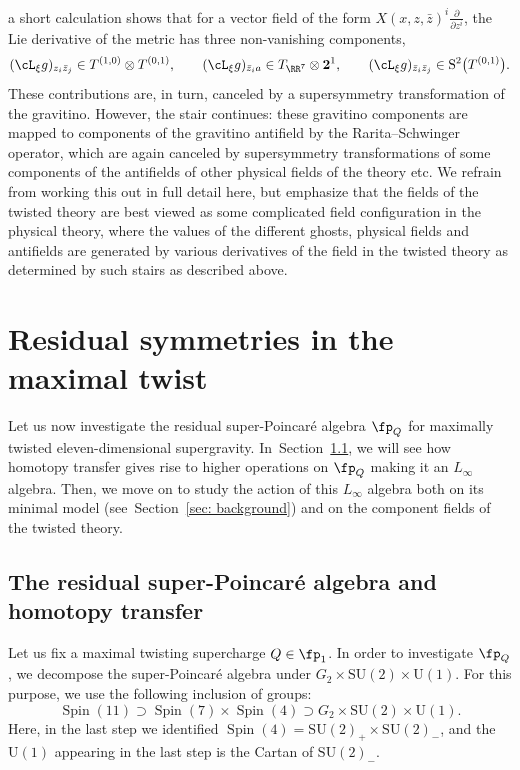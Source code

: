 \documentclass[10pt,a4paper]{amsart}
\numberwithin{equation}{section}
\theoremstyle{definition}
\DeclareMathOperator{\Spin}{Spin}
\def\U{\ensuremath{\mathrm{U}}}
\def\SU{\ensuremath{\mathrm{SU}}}
\begin{document}
a short calculation shows that for a vector field of the form $X(x,z,\bar{z})^i \frac{\partial}{\partial z^i}$, the Lie derivative of the metric has three non-vanishing components,
\[
 (\cL_\xi g)_{z_i \bar{z}_j} \in T^{(1,0)} \otimes T^{(0,1)} ,\qquad (\cL_\xi g)_{\bar{z}_i a} \in T_{\RR^7} \otimes \textbf{2}^1, \qquad (\cL_\xi g)_{\bar{z}_i \bar{z}_j} \in \mathrm{S}^2\big(T^{(0,1)}\big).
\]
These contributions are, in turn, canceled by a supersymmetry transformation of the gravitino. However, the stair continues: these gravitino components are mapped to components of the gravitino antifield by the Rarita--Schwinger operator, which are again canceled by supersymmetry transformations of some components of the antifields of other physical fields of the theory etc. We refrain from working this out in full detail here, but emphasize that the fields of the twisted theory are best viewed as some complicated field configuration in the physical theory, where the values of the different ghosts, physical fields and antifields are generated by various derivatives of the field in the twisted theory as determined by such stairs as described above.


\section{Residual symmetries in the maximal twist} \label{sec: max}

Let us now investigate the residual super-Poincar\'e algebra $\fp_Q$ for maximally twisted eleven-dimensional supergravity. In~Section~\ref{sec: max-ht}, we will see how homotopy transfer gives rise to higher operations on $\fp_Q$ making it an $L_\infty$ algebra. Then, we move on to study the action of this $L_\infty$ algebra both on its minimal model (see~Section~\ref{sec: background}) and on the component fields of the twisted theory.

\subsection{The residual super-Poincar\'e algebra and homotopy transfer} \label{sec: max-ht}
Let us fix a maximal twisting supercharge $Q \in \fp_1$. In order to investigate $\fp_Q$, we decompose the super-Poincar\'e algebra under $G_2 \times \SU(2) \times \U(1)$. For this purpose, we use the following inclusion of groups:
\[
 \Spin(11) \supset \Spin(7) \times \Spin(4) \supset G_2 \times \SU(2) \times \U(1).
\]
Here, in the last step we identified $\Spin(4) = \SU(2)_+ \times \SU(2)_-$, and the $\U(1)$ appearing in the last step is the Cartan of $\SU(2)_-$.
\end{document}

